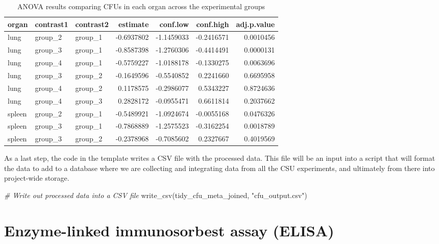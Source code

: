 \documentclass[
]{book}
\newenvironment{Shaded}{\begin{snugshade}}{\end{snugshade}}
\newcommand{\CommentTok}[1]{\textcolor[rgb]{0.56,0.35,0.01}{\textit{#1}}}
\newcommand{\FunctionTok}[1]{\textcolor[rgb]{0.00,0.00,0.00}{#1}}
\newcommand{\NormalTok}[1]{#1}
\newcommand{\StringTok}[1]{\textcolor[rgb]{0.31,0.60,0.02}{#1}}
\begin{document}
\begin{table}

\caption{\label{tab:unnamed-chunk-33}ANOVA results comparing CFUs in each organ across the experimental groups}
\centering
\begin{tabular}[t]{l|l|l|r|r|r|r}
\hline
organ & contrast1 & contrast2 & estimate & conf.low & conf.high & adj.p.value\\
\hline
lung & group\_2 & group\_1 & -0.6937802 & -1.1459033 & -0.2416571 & 0.0010456\\
\hline
lung & group\_3 & group\_1 & -0.8587398 & -1.2760306 & -0.4414491 & 0.0000131\\
\hline
lung & group\_4 & group\_1 & -0.5759227 & -1.0188178 & -0.1330275 & 0.0063696\\
\hline
lung & group\_3 & group\_2 & -0.1649596 & -0.5540852 & 0.2241660 & 0.6695958\\
\hline
lung & group\_4 & group\_2 & 0.1178575 & -0.2986077 & 0.5343227 & 0.8724636\\
\hline
lung & group\_4 & group\_3 & 0.2828172 & -0.0955471 & 0.6611814 & 0.2037662\\
\hline
spleen & group\_2 & group\_1 & -0.5489921 & -1.0924674 & -0.0055168 & 0.0476326\\
\hline
spleen & group\_3 & group\_1 & -0.7868889 & -1.2575523 & -0.3162254 & 0.0018789\\
\hline
spleen & group\_3 & group\_2 & -0.2378968 & -0.7085602 & 0.2327667 & 0.4019569\\
\hline
\end{tabular}
\end{table}

As a last step, the code in the template writes a CSV file with the processed
data. This file will be an input into a script that will format the data to
add to a database where we are collecting and integrating data from all the CSU
experiments, and ultimately from there into project-wide storage.

\begin{Shaded}
\begin{Highlighting}[]
\CommentTok{\# Write out processed data into a CSV file}
\FunctionTok{write\_csv}\NormalTok{(tidy\_cfu\_meta\_joined, }\StringTok{"cfu\_output.csv"}\NormalTok{)}
\end{Highlighting}
\end{Shaded}

\hypertarget{enzyme-linked-immunosorbest-assay-elisa}{%
\chapter{Enzyme-linked immunosorbest assay (ELISA)}\label{enzyme-linked-immunosorbest-assay-elisa}}
\end{document}
